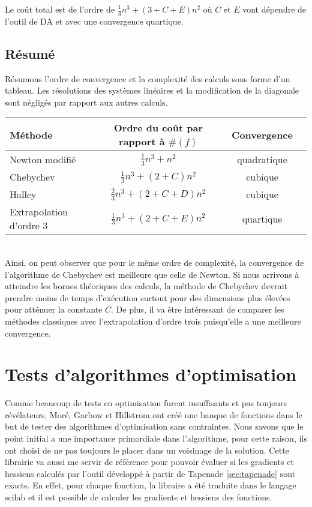 Le coût total est de l'ordre de $\frac{1}{3}n^3 +(3+C+E)n^2$ o\`u $C$ et $E$ vont d\'ependre de l'outil de DA et avec une convergence
quartique.



\subsection{R\'esum\'e}
R\'esumons l'ordre de convergence et la complexit\'e des calculs sous forme d'un tableau. Les r\'esolutions des syst\`emes lin\'eaires
et la modification de la diagonale sont n\'eglig\'es par rapport aux autres calculs.\\

\begin{tabular}{|l|c|c|c|}\hline
M\'ethode & Ordre du coût par rapport \`a $\#(f)$ & Convergence \\
\hline
Newton modifi\'e& $\frac{1}{3}n^3+n^2$ & quadratique\\
Chebychev & $\frac{1}{3}n^3+(2+C)n^2$  & cubique \\
Halley & $\frac{2}{3}n^3+(2+C+D)n^2$ & cubique \\
Extrapolation d'ordre 3 & $\frac{1}{3}n^3 +(2+C+E)n^2$  & quartique \\
\hline
\end{tabular}\\


\noindent
Ainsi, on peut observer que pour le même ordre de complexit\'e, la convergence de l'algorithme de 
Chebychev est meilleure que celle de Newton. Si nous arrivons \`a atteindre les bornes th\'eoriques des calculs, la m\'ethode 
de Chebychev devrait prendre moins de temps d'ex\'ecution surtout pour des dimensions plus \'elev\'ees pour att\'enuer la constante $C$.
De plus, il va être int\'eressant de comparer les m\'ethodes classiques avec l'extrapolation d'ordre trois puisqu'elle a une meilleure
convergence.





\section{Tests d'algorithmes d'optimisation}

Comme beaucoup de tests en optimisation furent insuffisants et pas toujours r\'ev\'elateurs, Mor\'e, Garbow et Hillstrom
ont cr\'e\'e une banque de fonctions dans le but de tester des algorithmes d'optimisation sans contraintes.
 Nous savons que le point initial a une importance primordiale dans l'algorithme, pour cette raison, ils ont choisi de ne 
pas toujours le placer dans un voisinage de la solution. 
Cette librairie va aussi me servir de r\'ef\'erence pour pouvoir \'evaluer si les gradients et hessiens calcul\'es par l'outil d\'evelopp\'e \`a partir de Tapenade \ref{sec:tapenade}
 sont exacts. En effet, pour chaque fonction, la libraire a \'et\'e traduite dans le langage scilab et il est possible de calculer les gradients
et hessiens des fonctions.



